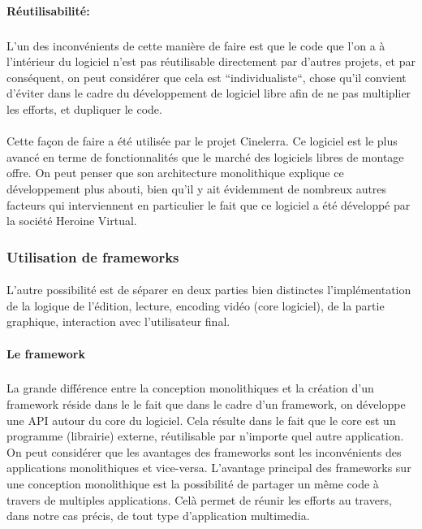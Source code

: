 \paragraph{Réutilisabilité:}

\subparagraph { }

L'un des inconvénients de cette manière de faire est que le code que
l'on a à l'intérieur du logiciel n'est pas réutilisable directement
par d'autres projets, et par conséquent, on peut considérer que cela
est ``individualiste``, chose qu'il convient d'éviter dans le cadre du
développement de logiciel libre afin de ne pas multiplier les efforts,
et dupliquer le code.

\paragraph{}

Cette façon de faire a été utilisée par le projet Cinelerra. Ce
logiciel est le plus avancé en terme de fonctionnalités que le
marché des logiciels libres de montage offre. On peut penser que son
architecture monolithique explique ce développement
plus abouti, bien qu'il y ait évidemment de nombreux autres facteurs qui
interviennent en particulier le fait que ce logiciel a été développé
par la société Heroine Virtual.

\subsubsection {Utilisation de  frameworks }

\paragraph{}

L'autre possibilité est de séparer en deux parties bien distinctes
l'implémentation de la logique de l'édition, lecture, encoding vidéo
(core logiciel), de la partie graphique, interaction avec l'utilisateur
final.

\paragraph {Le framework}

\subparagraph{}

La grande différence entre la conception monolithiques
 et la création d'un framework 
réside dans le le fait que dans le cadre d'un framework, on développe
une API  autour du core du logiciel. Cela résulte dans le
fait que le core est un programme (librairie) externe, réutilisable par
n'importe quel autre application.  On peut considérer que les avantages
des frameworks sont les inconvénients des applications monolithiques
 et vice-versa. L'avantage principal des frameworks
sur une conception monolithique est la possibilité
de partager un même code à travers de multiples applications. Celà
permet de réunir les efforts au travers, dans notre cas précis, de
tout type d'application multimedia.

